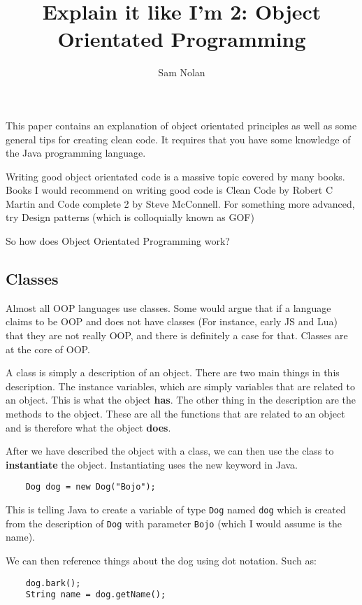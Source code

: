 \documentclass{article}
\author{Sam Nolan}
\title{Explain it like I'm 2: Object Orientated Programming}
\begin{document}
  \maketitle

  This paper contains an explanation of object orientated principles as well
  as some general tips for creating clean code. It requires that you have
  some knowledge of the Java programming language.

  Writing good object orientated code is a massive topic covered by many books.
  Books I would recommend on writing good code is Clean Code by Robert C Martin and
  Code complete 2 by Steve McConnell. For something more advanced, try Design patterns
  (which is colloquially known as GOF)

  So how does Object Orientated Programming work?

  \subsection*{Classes}
  Almost all OOP languages use classes. Some would argue that if a language
  claims to be OOP and does not have classes (For instance, early JS and Lua)
  that they are not really OOP, and there is definitely a case for that.
  Classes are at the core of OOP.

  A class is simply a description of an object. There are two main things in
  this description. The instance variables, which are simply variables that are
  related to an object. This is what the object \textbf{has}. The other thing
  in the description are the methods to the object. These are all the functions
  that are related to an object and is therefore what the object \textbf{does}.

  After we have described the object with a class, we can then use the class
  to \textbf{instantiate} the object. Instantiating uses the new keyword in
  Java.

  \begin{verbatim}
    Dog dog = new Dog("Bojo");
  \end{verbatim}

  This is telling Java to create a variable of type \texttt{Dog} named \texttt{dog} which is
  created from the description of \texttt{Dog} with parameter \texttt{Bojo} (which I would assume
  is the name).

  We can then reference things about the dog using dot notation. Such as:

  \begin{verbatim}
    dog.bark();
    String name = dog.getName();
  \end{verbatim}
\end{document}
